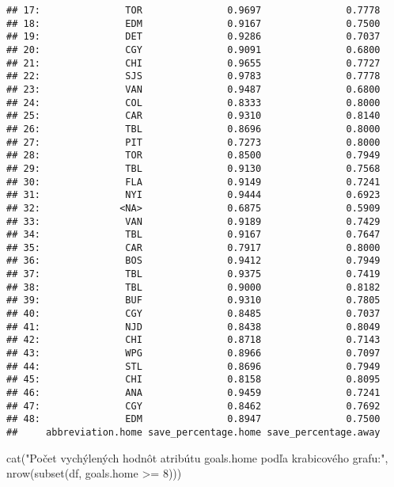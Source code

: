 \documentclass[
]{article}
\newenvironment{Shaded}{\begin{snugshade}}{\end{snugshade}}
\newcommand{\DecValTok}[1]{\textcolor[rgb]{0.00,0.00,0.81}{#1}}
\newcommand{\FunctionTok}[1]{\textcolor[rgb]{0.00,0.00,0.00}{#1}}
\newcommand{\NormalTok}[1]{#1}
\newcommand{\SpecialCharTok}[1]{\textcolor[rgb]{0.00,0.00,0.00}{#1}}
\newcommand{\StringTok}[1]{\textcolor[rgb]{0.31,0.60,0.02}{#1}}
\begin{document}
\begin{verbatim}
## 17:               TOR               0.9697               0.7778
## 18:               EDM               0.9167               0.7500
## 19:               DET               0.9286               0.7037
## 20:               CGY               0.9091               0.6800
## 21:               CHI               0.9655               0.7727
## 22:               SJS               0.9783               0.7778
## 23:               VAN               0.9487               0.6800
## 24:               COL               0.8333               0.8000
## 25:               CAR               0.9310               0.8140
## 26:               TBL               0.8696               0.8000
## 27:               PIT               0.7273               0.8000
## 28:               TOR               0.8500               0.7949
## 29:               TBL               0.9130               0.7568
## 30:               FLA               0.9149               0.7241
## 31:               NYI               0.9444               0.6923
## 32:              <NA>               0.6875               0.5909
## 33:               VAN               0.9189               0.7429
## 34:               TBL               0.9167               0.7647
## 35:               CAR               0.7917               0.8000
## 36:               BOS               0.9412               0.7949
## 37:               TBL               0.9375               0.7419
## 38:               TBL               0.9000               0.8182
## 39:               BUF               0.9310               0.7805
## 40:               CGY               0.8485               0.7037
## 41:               NJD               0.8438               0.8049
## 42:               CHI               0.8718               0.7143
## 43:               WPG               0.8966               0.7097
## 44:               STL               0.8696               0.7949
## 45:               CHI               0.8158               0.8095
## 46:               ANA               0.9459               0.7241
## 47:               CGY               0.8462               0.7692
## 48:               EDM               0.8947               0.7500
##     abbreviation.home save_percentage.home save_percentage.away
\end{verbatim}

\begin{Shaded}
\begin{Highlighting}[]
\FunctionTok{cat}\NormalTok{(}\StringTok{"Počet vychýlených hodnôt atribútu goals.home podľa krabicového grafu:"}\NormalTok{, }\FunctionTok{nrow}\NormalTok{(}\FunctionTok{subset}\NormalTok{(df, goals.home }\SpecialCharTok{\textgreater{}=} \DecValTok{8}\NormalTok{)))}
\end{Highlighting}
\end{Shaded}
\end{document}
